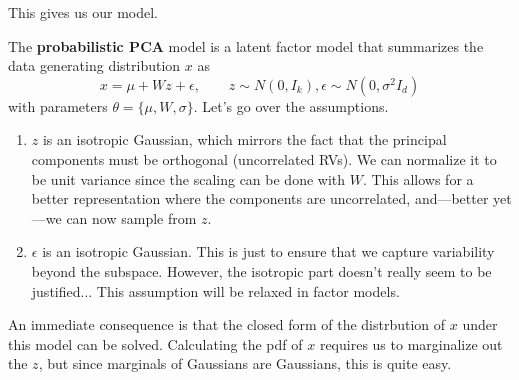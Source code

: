   This gives us our model. 

  \begin{definition} 
    The \textbf{probabilistic PCA} model is a latent factor model that summarizes the data generating distribution $x$ as  
    \begin{equation}
      x = \mu + W z + \epsilon, \qquad z \sim N(0, I_k), \epsilon \sim N(0, \sigma^2 I_d) 
    \end{equation} 
    with parameters $\theta = \{\mu, W, \sigma\}$. Let's go over the assumptions. 
    \begin{enumerate}
      \item $z$ is an isotropic Gaussian, which mirrors the fact that the principal components must be orthogonal (uncorrelated RVs). We can normalize it to be unit variance since the scaling can be done with $W$. This allows for a better representation where the components are uncorrelated, and---better yet---we can now sample from $z$. 
      \item $\epsilon$ is an isotropic Gaussian. This is just to ensure that we capture variability beyond the subspace. However, the isotropic part doesn't really seem to be justified... This assumption will be relaxed in factor models.  
    \end{enumerate}
  \end{definition} 

  An immediate consequence is that the closed form of the distrbution of $x$ under this model can be solved. Calculating the pdf of $x$ requires us to marginalize out the $z$, but since marginals of Gaussians are Gaussians, this is quite easy. 

